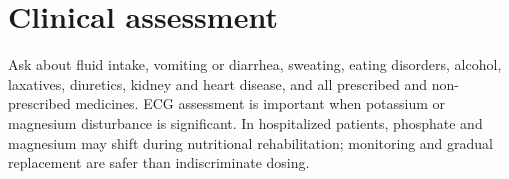 \section{Clinical assessment}
Ask about fluid intake, vomiting or diarrhea, sweating, eating disorders, alcohol, laxatives, diuretics, kidney and heart disease, and all prescribed and non-prescribed medicines. ECG assessment is important when potassium or magnesium disturbance is significant. In hospitalized patients, phosphate and magnesium may shift during nutritional rehabilitation; monitoring and gradual replacement are safer than indiscriminate dosing.
